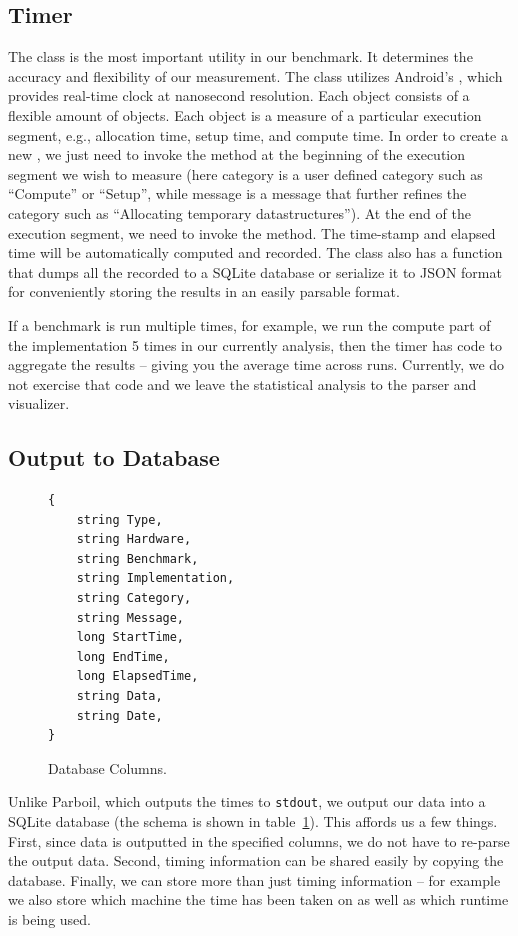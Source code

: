 \subsection*{Timer}
The  class is the most important utility in our benchmark. It
determines the accuracy and flexibility of our measurement. The 
class utilizes Android's , which provides real-time clock at
nanosecond resolution. Each  object consists of a flexible amount of
 objects. Each  object is a measure of a
particular execution segment, e.g., allocation time, setup time, and compute
time. In order to create a new , we just need to invoke the
 method at the beginning of the execution
segment we wish to measure (here category is a user defined category such as
``Compute'' or ``Setup'', while message is a message that further refines the
category such as ``Allocating temporary datastructures''). At the end of the
execution segment, we need to invoke the  method. The
time-stamp and elapsed time will be automatically computed and recorded. The
 class also has a function that dumps all the recorded
 to a SQLite database or serialize it to JSON format for
conveniently storing the results in an easily parsable format.

If a benchmark is run multiple times, for example, we run the compute part of
the implementation 5 times in our currently analysis, then the timer has code to
aggregate the results -- giving you the average time across runs.  Currently, we
do not exercise that code and we leave the statistical analysis to the parser
and visualizer.

\subsection*{Output to Database}


\begin{figure}[t!]
\begin{verbatim}
{
	string Type,
	string Hardware,
	string Benchmark,
	string Implementation,
	string Category,
	string Message,
	long StartTime,
	long EndTime,
	long ElapsedTime,
	string Data,
	string Date,
}
\end{verbatim}
\caption{Database Columns.}
\label{fig:database}
\centering
\end{figure}

Unlike Parboil, which outputs the times to {\tt stdout}, we output our data into
a SQLite database (the schema is shown in table~\ref{fig:database}).  This affords us a few things.  First, since data is outputted
in the specified columns, we do not have to re-parse the output data.  Second,
timing information can be shared easily by copying the database.  Finally, we
can store more than just timing information -- for example we also store which machine the time has been taken on as well as which runtime is being used.

